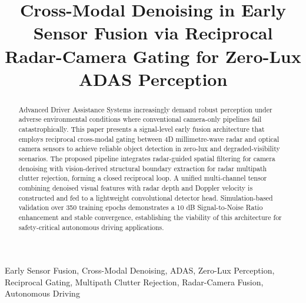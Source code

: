 \documentclass[conference]{IEEEtran}
\begin{document}
\title{Cross-Modal Denoising in Early Sensor Fusion via Reciprocal Radar-Camera Gating for Zero-Lux ADAS Perception}

\author{
\and
{}
}

\maketitle

\begin{abstract}
Advanced Driver Assistance Systems increasingly demand robust perception under adverse environmental conditions where conventional camera-only pipelines fail catastrophically. This paper presents a signal-level early fusion architecture that employs reciprocal cross-modal gating between 4D millimetre-wave radar and optical camera sensors to achieve reliable object detection in zero-lux and degraded-visibility scenarios. The proposed pipeline integrates radar-guided spatial filtering for camera denoising with vision-derived structural boundary extraction for radar multipath clutter rejection, forming a closed reciprocal loop. A unified multi-channel tensor combining denoised visual features with radar depth and Doppler velocity is constructed and fed to a lightweight convolutional detector head. Simulation-based validation over 350 training epochs demonstrates a 10 dB Signal-to-Noise Ratio enhancement and stable convergence, establishing the viability of this architecture for safety-critical autonomous driving applications.
\end{abstract}

\begin{IEEEkeywords}
Early Sensor Fusion, Cross-Modal Denoising, ADAS, Zero-Lux Perception, Reciprocal Gating, Multipath Clutter Rejection, Radar-Camera Fusion, Autonomous Driving
\end{IEEEkeywords}
\end{document}
